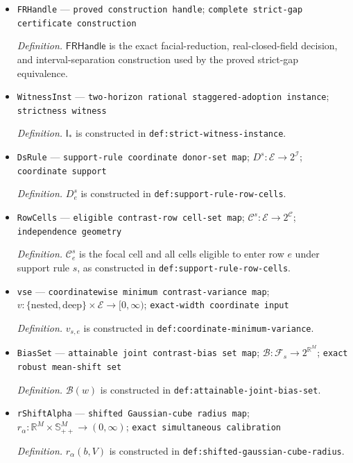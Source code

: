 \documentclass{article}
\begin{document}
\begin{itemize}
  \par\smallskip\noindent\emph{Definition.} \(\mathsf{GapCert}\) is the record constructed in \texttt{def:gap-certificate}.
  \item \texttt{FRHandle} --- \texttt{proved construction handle}; \texttt{complete strict-\allowbreak{}gap certificate construction}
  \par\smallskip\noindent\emph{Definition.} \(\mathsf{FRHandle}\) is the exact facial-reduction, real-closed-field decision, and interval-separation construction used by the proved strict-gap equivalence.
  \item \texttt{WitnessInst} --- \texttt{two-\allowbreak{}horizon rational staggered-\allowbreak{}adoption instance}; \texttt{strictness witness}
  \par\smallskip\noindent\emph{Definition.} \(\mathsf I_*\) is constructed in \texttt{def:strict-witness-instance}.
  \item \texttt{DsRule} --- \texttt{support-\allowbreak{}rule coordinate donor-\allowbreak{}set map}; \(D^s:\mathcal E\to2^{\mathcal I}\); \texttt{coordinate support}
  \par\smallskip\noindent\emph{Definition.} \(D^s_e\) is constructed in \texttt{def:support-rule-row-cells}.
  \item \texttt{RowCells} --- \texttt{eligible contrast-\allowbreak{}row cell-\allowbreak{}set map}; \(\mathcal C^s:\mathcal E\to2^{\mathcal C}\); \texttt{independence geometry}
  \par\smallskip\noindent\emph{Definition.} \(\mathcal C^s_e\) is the focal cell and all cells eligible to enter row \(e\) under support rule \(s\), as constructed in \texttt{def:support-rule-row-cells}.
  \item \texttt{vse} --- \texttt{coordinatewise minimum contrast-\allowbreak{}variance map}; \(v:\{\mathrm{nested},\mathrm{deep}\}\times\mathcal E\to[0,\infty)\); \texttt{exact-\allowbreak{}width coordinate input}
  \par\smallskip\noindent\emph{Definition.} \(v_{s,e}\) is constructed in \texttt{def:coordinate-minimum-variance}.
  \item \texttt{BiasSet} --- \texttt{attainable joint contrast-\allowbreak{}bias set map}; \(\mathcal B:\mathcal F_s\to2^{\mathbb R^M}\); \texttt{exact robust mean-\allowbreak{}shift set}
  \par\smallskip\noindent\emph{Definition.} \(\mathcal B(w)\) is constructed in \texttt{def:attainable-joint-bias-set}.
  \item \texttt{rShiftAlpha} --- \texttt{shifted Gaussian-\allowbreak{}cube radius map}; \(r_\alpha:\mathbb R^M\times\mathbb S_{++}^M\to(0,\infty)\); \texttt{exact simultaneous calibration}
  \par\smallskip\noindent\emph{Definition.} \(r_\alpha(b,V)\) is constructed in \texttt{def:shifted-gaussian-cube-radius}.
\end{itemize}
\end{document}
